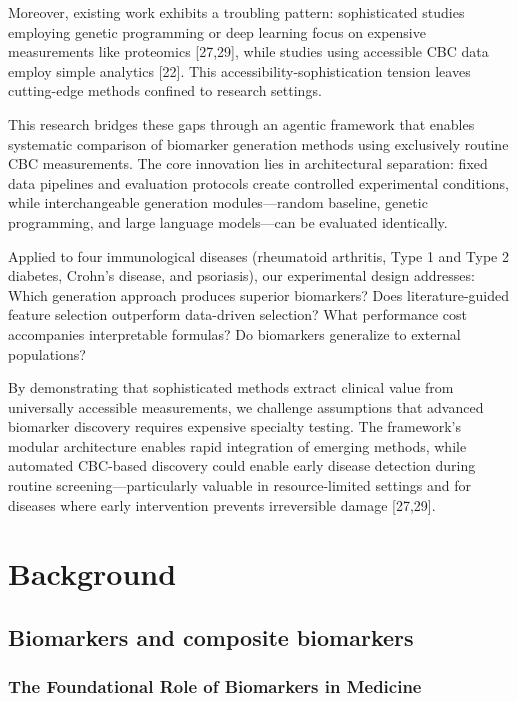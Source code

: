 \documentclass[12pt,a4paper]{article}
\begin{document}
Moreover, existing work exhibits a troubling pattern: sophisticated studies employing genetic programming or deep learning focus on expensive measurements like proteomics [27,29], while studies using accessible CBC data employ simple analytics [22]. This accessibility-sophistication tension leaves cutting-edge methods confined to research settings.

This research bridges these gaps through an agentic framework that enables systematic comparison of biomarker generation methods using exclusively routine CBC measurements. The core innovation lies in architectural separation: fixed data pipelines and evaluation protocols create controlled experimental conditions, while interchangeable generation modules—random baseline, genetic programming, and large language models—can be evaluated identically.

Applied to four immunological diseases (rheumatoid arthritis, Type 1 and Type 2 diabetes, Crohn's disease, and psoriasis), our experimental design addresses: Which generation approach produces superior biomarkers? Does literature-guided feature selection outperform data-driven selection? What performance cost accompanies interpretable formulas? Do biomarkers generalize to external populations?

By demonstrating that sophisticated methods extract clinical value from universally accessible measurements, we challenge assumptions that advanced biomarker discovery requires expensive specialty testing. The framework's modular architecture enables rapid integration of emerging methods, while automated CBC-based discovery could enable early disease detection during routine screening—particularly valuable in resource-limited settings and for diseases where early intervention prevents irreversible damage [27,29].

\section{Background}

\subsection{Biomarkers and composite biomarkers}

\subsubsection{The Foundational Role of Biomarkers in Medicine}
\end{document}
